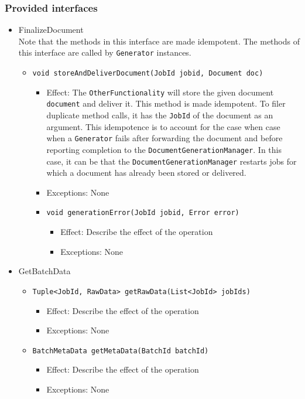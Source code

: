 \documentclass[a4paper,10pt]{article}
\begin{document}
\subsubsection*{Provided interfaces}
\begin{itemize}
    \item FinalizeDocument\\
    Note that the methods in this interface are made idempotent. The methods of this interface are called by \texttt{Generator} instances. 
    \begin{itemize}
        \item \texttt{void storeAndDeliverDocument(JobId jobid, Document doc)}
        \begin{itemize}
            \item Effect: The \texttt{OtherFunctionality} will store the given document \texttt{document} and deliver it. This method is made idempotent. To filer duplicate method calls, it has the \texttt{JobId} of the document as an argument. This idempotence is to account for the case when case when a \texttt{Generator} fails after forwarding the document and before reporting completion to the \texttt{DocumentGenerationManager}. In this case, it can be that the \texttt{DocumentGenerationManager} restarts jobs for which a document has already been stored or delivered.
            \item Exceptions: None

            \item \texttt{void generationError(JobId jobid, Error error)}
            \begin{itemize}
                \item Effect: Describe the effect of the operation
                \item Exceptions: None
            \end{itemize}
        \end{itemize}
    \end{itemize}

    \item GetBatchData
    \begin{itemize}
        \item \texttt{Tuple<JobId, RawData> getRawData(List<JobId> jobIds)}
        \begin{itemize}
            \item Effect: Describe the effect of the operation
            \item Exceptions: None
        \end{itemize}
        \item \texttt{BatchMetaData getMetaData(BatchId batchId)}
        \begin{itemize}
            \item Effect: Describe the effect of the operation
            \item Exceptions: None
        \end{itemize}
    \end{itemize}


\end{itemize}
\end{document}
